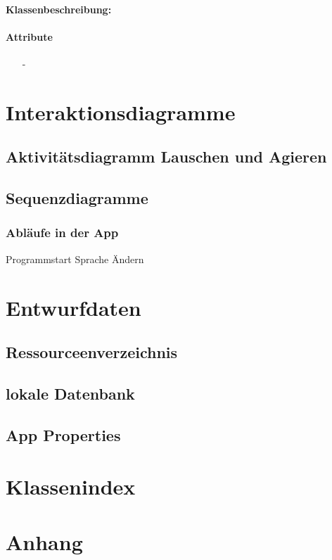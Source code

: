 \documentclass[a4paper,12pt]{article}
\begin{document}
		\paragraph{Klassenbeschreibung:}
		\paragraph{Attribute}
		\begin{itemize}
			\item [-]
		\end{itemize}

\section{Interaktionsdiagramme}
\subsection{Aktivitätsdiagramm Lauschen und Agieren}
\subsection{Sequenzdiagramme}
\subsubsection{Abläufe in der App}
Programmstart
Sprache Ändern
\section{Entwurfdaten}
\subsection{Ressourceenverzeichnis}
\subsection{lokale Datenbank}
\subsection{App Properties}

\section{Klassenindex}
\section{Anhang}

\clearpage
\printglossaries
{}
\end{document}
